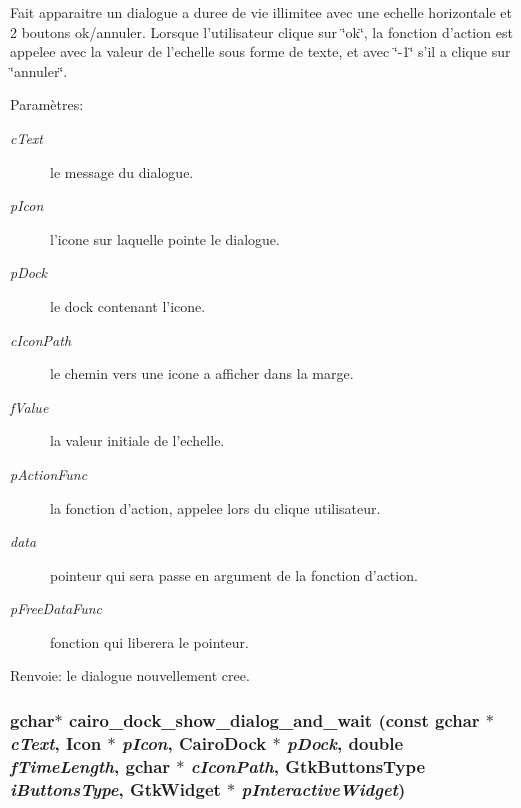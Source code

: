 Fait apparaitre un dialogue a duree de vie illimitee avec une echelle horizontale et 2 boutons ok/annuler. Lorsque l'utilisateur clique sur \char`\"{}ok\char`\"{}, la fonction d'action est appelee avec la valeur de l'echelle sous forme de texte, et avec \char`\"{}-1\char`\"{} s'il a clique sur \char`\"{}annuler\char`\"{}. \begin{Desc}
\item[Param\`{e}tres:]
\begin{description}
\item[{\em c\-Text}]le message du dialogue. \item[{\em p\-Icon}]l'icone sur laquelle pointe le dialogue. \item[{\em p\-Dock}]le dock contenant l'icone. \item[{\em c\-Icon\-Path}]le chemin vers une icone a afficher dans la marge. \item[{\em f\-Value}]la valeur initiale de l'echelle. \item[{\em p\-Action\-Func}]la fonction d'action, appelee lors du clique utilisateur. \item[{\em data}]pointeur qui sera passe en argument de la fonction d'action. \item[{\em p\-Free\-Data\-Func}]fonction qui liberera le pointeur. \end{description}
\end{Desc}
\begin{Desc}
\item[Renvoie:]le dialogue nouvellement cree. \end{Desc}
\subsubsection{\setlength{\rightskip}{0pt plus 5cm}gchar$\ast$ cairo\_\-dock\_\-show\_\-dialog\_\-and\_\-wait (const gchar $\ast$ {\em c\-Text}, {\bf Icon} $\ast$ {\em p\-Icon}, {\bf Cairo\-Dock} $\ast$ {\em p\-Dock}, double {\em f\-Time\-Length}, gchar $\ast$ {\em c\-Icon\-Path}, Gtk\-Buttons\-Type {\em i\-Buttons\-Type}, Gtk\-Widget $\ast$ {\em p\-Interactive\-Widget})}\label{cairo-dock-dialogs_8c_2848034bb65d6232b2a862739d4fc208}


